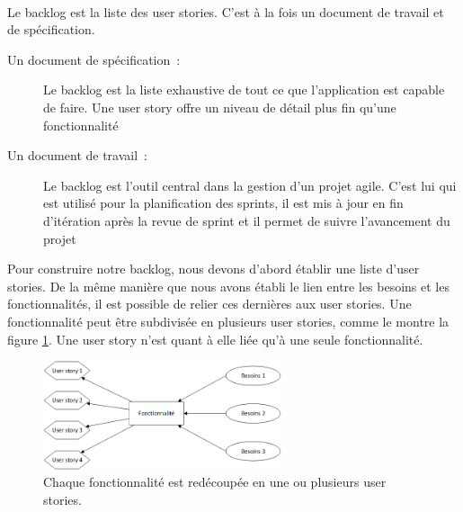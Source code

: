 			\paragraph{}%
			Le backlog est la liste des user stories. C'est à la fois un document de
			travail et de spécification.
			\begin{description}
				\item[Un document de spécification~:] Le backlog est la liste exhaustive de
				tout ce que l'application est capable de faire. Une user story offre un
				niveau de détail plus fin qu'une fonctionnalité
				\item[Un document de travail~:] Le backlog est l'outil central dans la
				gestion d'un projet agile. C'est lui qui est utilisé pour la planification
				des sprints, il est mis à jour en fin d'itération après la revue de sprint
				et il permet de suivre l'avancement du projet
			\end{description}
			Pour construire notre backlog, nous devons d'abord établir une liste d'user
			stories.
			De la même manière que nous avons établi le lien entre les besoins et
			les fonctionnalités, il est possible de relier ces dernières aux user
			stories.
			Une fonctionnalité peut être subdivisée en plusieurs user stories, comme le
			montre la figure \ref{mapping_fonctios_us}. Une user story n'est quant à elle
			liée qu'à une seule fonctionnalité.
			\begin{figure}[H]%
				\centering
				\includegraphics[width=7cm]{../img/part3/mapping_fonctios_us.png}
				\caption{\label{mapping_fonctios_us} Chaque fonctionnalité est redécoupée
				en une ou plusieurs user stories.}
			\end{figure}
			
